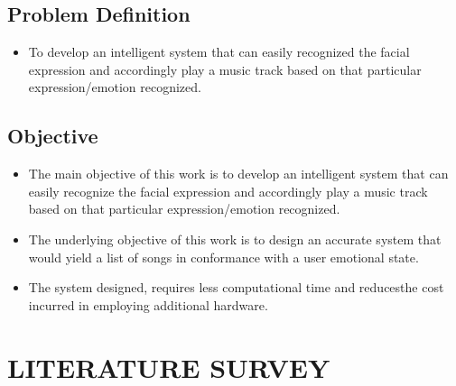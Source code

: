 \documentclass[12pt]{report}
\begin{document}
\subsection{Problem Definition}

\justifying
\setlength{\parindent}{4em}
\setlength{\parskip}{0.5em}
\renewcommand{\baselinestretch}{1.5}
\normalsize \hspace{1.7cm}\begin{itemize}\item To develop an intelligent system that can easily recognized the facial expression and 
accordingly play a music track based on that particular expression/emotion recognized.

\end{itemize}
\raggedright
\subsection{Objective}

\justifying
\setlength{\parindent}{4em}
\setlength{\parskip}{0.5em}
\renewcommand{\baselinestretch}{1.5}
\normalsize \hspace{1.7cm}\begin{itemize}\item The main objective of this work is to develop an intelligent system that can easily 
recognize the facial expression and accordingly play a music track based on that particular
expression/emotion recognized.

\item  The underlying objective of this work is to design an accurate system that would yield a 
list of songs in conformance with a user emotional state.

\item   The system designed, requires less computational time and reducesthe cost incurred in 
employing additional hardware.


\end{itemize}



\centering
\section{LITERATURE SURVEY}
\end{document}
